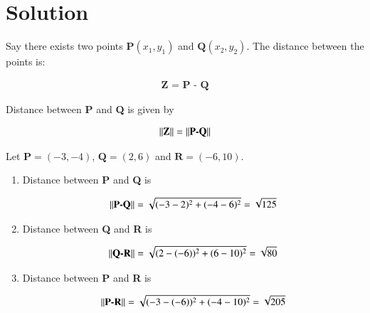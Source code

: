 \documentclass[journal,12pt,twocolumn]{IEEEtran}
\begin{document}



\section{Solution}

Say there exists two points $\textbf{P}(x_1, y_1)$ and $\textbf{Q}(x_2, y_2)$. The distance between the points is:

\begin{align}
    \textbf{Z = P - Q}
\end{align}

Distance between \textbf{P} and \textbf{Q} is given by 


\begin{align}
||\textbf{Z}|| = \left\lVert\textbf{P-Q}\right\rVert
\end{align}



Let $\textbf{P} = (-3, -4)$, $\textbf{Q} = (2, 6)$ and $\textbf{R} = (-6, 10)$.

\begin{enumerate}
    \item Distance between \textbf{P} and \textbf{Q} is 

\begin{align}
\left\lVert\textbf{P-Q}\right\rVert = \sqrt{(-3-2)^2+(-4-6)^2}
=\sqrt{125}
\end{align}


\item Distance between \textbf{Q} and \textbf{R} is 

\begin{align}
\left\lVert\textbf{Q-R}\right\rVert = \sqrt{(2-(-6))^2+(6-10)^2}
=\sqrt{80}
\end{align}

\item Distance between \textbf{P} and \textbf{R} is 

\begin{align}
\left\lVert\textbf{P-R}\right\rVert = \sqrt{(-3-(-6))^2+(-4-10)^2}
=\sqrt{205}
\end{align}

\end{enumerate}
\end{document}
